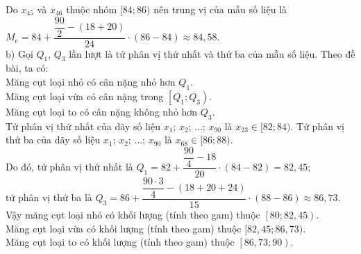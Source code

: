 \begin{ex}
{		Do  ${x_{45}}$ và ${x_{46}}$ thuộc nhóm ${[84; 86)}$ nên trung vị của mẫu số liệu là\\
		${M_e=84+\dfrac{\dfrac{90}{2}-(18+20)}{24} \cdot  (86-84) \approx 84,58
		 }$.\\
		b) Gọi $Q_1$, $Q_3$ lần lượt là tứ phân vị thứ nhất và thứ ba  của mẫu số liệu. Theo đề bài, ta có:\\
		Măng cụt loại nhỏ có cân nặng nhỏ hơn  $Q_1$.\\
		Măng cụt loại vừa  có cân nặng trong ${\left[Q_1; Q_3\right)}$.\\
		Măng cụt loại to có cân nặng không nhỏ  hơn $Q_3$.\\
		Tứ phân vị thứ nhất của  dãy số liệu $x_1$; $x_2$; $\ldots$; $x_{90}$ là ${x_{23} \in[82; 84)}$. Tứ phân vị thứ ba của dãy số liệu $x_1$; $x_2$; $\ldots$; $x_{90}$ là ${x_{68} \in[86; 88)}$.\\
		Do đó, tứ phân vị thứ nhất là ${Q_1=82+\dfrac{\dfrac{90}{4}-18}{20}  \cdot(84-82)=82,45}$;\\
		 tứ phân vị thứ ba là ${Q_3=86+\dfrac{\dfrac{90 \cdot 3}{4}-(18+20+24)}{15} \cdot(88-86) \approx 86,73}$.\\
		Vậy măng cụt loại nhỏ có khối lượng (tính theo gam) thuộc  $\left[80;82,45 \right).$\\
		Măng cụt loại vừa  có khối lượng (tính theo gam) thuộc $[82,45;86,73)$.\\
	Măng cụt loại to có  khối lượng (tính theo gam) thuộc $\left[86,73;90 \right).$}
\end{ex}

